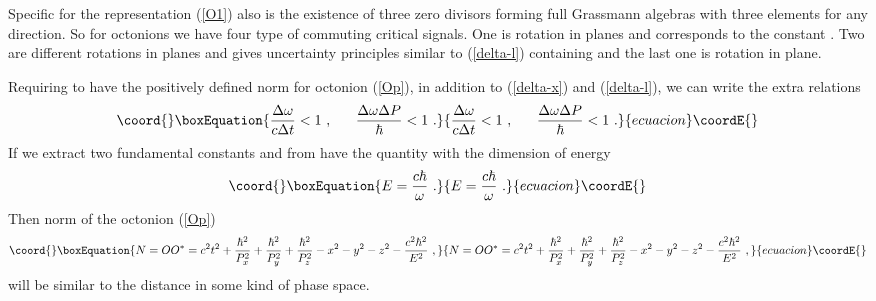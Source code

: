\documentclass[a4paper,12pt]{article}
\begin{document}
Specific for the representation (\ref{O1}) also is the existence of three zero divisors 
forming full Grassmann algebras with three elements for any direction. So for octonions 
we have four type of commuting critical signals. One is rotation in \coordHE{} planes and 
corresponds to the constant \coordHE{}. Two are different rotations in \coordHE{} planes and gives 
uncertainty principles similar to (\ref{delta-l}) containing \myHighlight{$\hbar$}\coordHE{} and the last one is 
rotation in \coordHE{} plane. 

Requiring to have the positively defined norm for octonion (\ref{Op}), in addition to 
(\ref{delta-x}) and (\ref{delta-l}), we can write the extra relations 
\begin{equation}\coord{}\boxEquation{ \label{delta-e}
\frac{\Delta\omega}{c\Delta t} < 1 ~, ~~~~~ \frac{\Delta\omega\Delta P}{\hbar} < 1 ~.
}{ \frac{\Delta\omega}{c\Delta t} < 1 ~, ~~~~~ \frac{\Delta\omega\Delta P}{\hbar} < 1 ~.
}{ecuacion}\coordE{}\end{equation}
If we extract two fundamental constants \coordHE{} and \myHighlight{$\hbar$}\coordHE{} from \myHighlight{$\omega$}\coordHE{} have the quantity 
with the dimension of energy
\begin{equation}\coord{}\boxEquation{\label{E}
E = \frac{c\hbar}{\omega} ~.
}{E = \frac{c\hbar}{\omega} ~.
}{ecuacion}\coordE{}\end{equation}
Then norm of the octonion (\ref{Op}) 
\begin{equation}\coord{}\boxEquation{ \label{ON}
N = OO^* = c^2t^2 + \frac{\hbar^2}{P_x^2}+ \frac{\hbar^2}{P_y^2} + \frac{\hbar^2}{P_z^2} 
- x^2 - y^2 - z^2 - \frac{c^2\hbar^2}{E^2} ~,
}{ N = OO^* = c^2t^2 + \frac{\hbar^2}{P_x^2}+ \frac{\hbar^2}{P_y^2} + \frac{\hbar^2}{P_z^2} 
- x^2 - y^2 - z^2 - \frac{c^2\hbar^2}{E^2} ~,
}{ecuacion}\coordE{}\end{equation}
will be similar to the distance in some kind of phase space.
\end{document}
